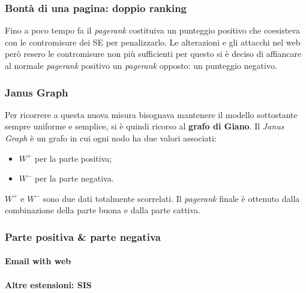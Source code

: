 			\subsubsection{Bontà di una pagina: doppio ranking}
				Fino a poco tempo fa il \emph{pagerank} costituiva un punteggio positivo che coesisteva con le contromisure dei SE per penalizzarlo. 
				Le alterazioni e gli attacchi nel web però resero le contromisure non più sufficienti per questo si è deciso di affiancare al normale \emph{pagerank} positivo un \emph{pagerank} opposto: un punteggio negativo.
			
			\subsubsection{Janus Graph}
				Per ricorrere a questa nuova misura bisognava mantenere il modello sottostante sempre uniforme e semplice, si è quindi ricorso al \textbf{grafo di Giano}.
				Il \emph{Janus Graph} è un grafo in cui ogni nodo ha due valori associati:
				\begin{itemize}
					\item $W^+$ per la parte positiva;
					\item $W^-$ per la parte negativa.	
				\end{itemize}	
				$W^+$ e $W^-$ sono due dati totalmente scorrelati. Il \emph{pagerank} finale è ottenuto dalla combinazione della parte buona e dalla parte cattiva.
									
			\subsubsection{Parte positiva \& parte negativa}
			
				\paragraph{Email with web}
				
				\paragraph{Altre estensioni: SIS}